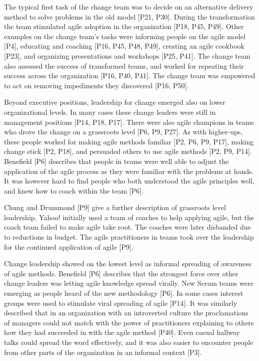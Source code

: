 \documentclass[preprint,authoryear,12pt]{elsarticle}
\begin{document}
The typical first task of the change team was to decide on an alternative
delivery method to solve problems in the old model [P21, P30]. During the
transformation the team stimulated agile adoption in the organization [P18, P45,
P49]. Other examples on the change team's tasks were informing people on the
agile model [P4], educating and coaching [P16, P45, P48, P49], creating an agile
cookbook [P23], and organizing presentations and workshops [P25, P41]. The
change team also assessed the success of transformed teams, and worked for
repeating their success across the organization [P16, P40, P41]. The change team
was empowered to act on removing impediments they discovered [P16, P50].


Beyond executive positions, leadership for change emerged also on lower
organizational levels. In many cases these change leaders were still in
management positions [P14, P18, P17]. There were also agile champions in teams
who drove the change on a grassroots level [P6, P9, P27].
As with higher-ups, these people worked for making agile methods familiar [P2,
P6, P9, P17], making change stick [P2, P18], and persuaded others to use agile
methods [P2, P9, P14].
Benefield [P6] describes that people in teams were well able to adjust the
application of the agile process as they were familiar with the problems at
hands. It was however hard to find people who both understood the agile
principles well, and knew how to coach within the team [P6].

Chung and Drummond [P9] give a further description of grassroots level
leadership. Yahoo! initially used a team of coaches to help applying agile, but
the coach team failed to make agile take root. The coaches were later disbanded
due to reductions in budget. The agile practitioners in teams took over the
leadership for the continued application of agile [P9].


Change leadership showed on the lowest level as informal spreading of awareness
of agile methods.
Benefield [P6] describes that the strongest force over other change leaders was
letting agile knowledge spread virally. New Scrum teams were emerging as people
heard of the new methodology [P6]. In some cases interest groups were used to
stimulate viral spreading of agile [P14].
It was similarly described that in an organization with an introverted culture
the proclamations of managers could not match with the power of practitioners
explaining to others how they had succeeded in with the agile method [P40].
Even casual hallway talks could spread the word effectively, and it was also
easier to encounter people from other parts of the organization in an informal
context [P3].
\end{document}

